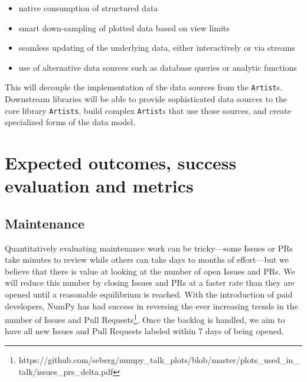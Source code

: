\documentclass[11pt,letterpaper]{article}  %
\begin{document}
\begin{itemize}[noitemsep]
  \item native consumption of structured data
  \item smart down-sampling of plotted data based on view limits
  \item seamless updating of the underlying data, either interactively or via streams
  \item use of alternative data sources such as database queries or analytic functions
\end{itemize}

This will decouple the implementation of the data sources from the \texttt{Artist}s.  Downstream libraries will be able to provide sophisticated data sources to the core library \texttt{Artists}, build complex \texttt{Artist}s that use those sources, and create specialized forms of the data model.  


\section{Expected outcomes, success evaluation and metrics}
\subsection{Maintenance}

Quantitatively evaluating maintenance work can be tricky---some Issues
or PRs take minutes to review while others can take days to
months of effort---but we believe that there is value at looking at
the number of open Issues and PRs.  We will reduce this number by closing Issues and PRs at a faster rate than they are opened until a reasonable equilibrium is reached. With the introduction of paid developers, NumPy has had success in reversing the ever increasing trends in the number of Issues and Pull Requests\footnote{https://github.com/seberg/numpy\_talk\_plots/blob/master/plots\_used\_in\_talk/issues\_prs\_delta.pdf}. Once the backlog is handled, we aim to have all new Issues and Pull Requests labeled within 7 days of being opened.
\end{document}
